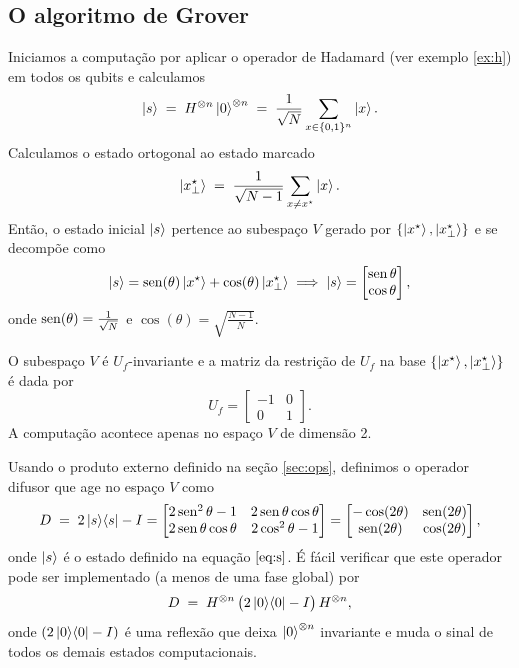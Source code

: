 \subsection{O algoritmo de Grover}
Iniciamos a computação por aplicar o operador de Hadamard (ver exemplo \ref{ex:h}) em todos os qubits e calculamos
\begin{equation}\label{eq:s}
\ket{s} \;=\; H^{\otimes n}\ket{0}^{\otimes n}
\;=\; \frac{1}{\sqrt{N}}\sum_{x\in\{0,1\}^n}\ket{x}.
\end{equation}
Calculamos o estado ortogonal ao estado marcado
\begin{equation}
\ket{x^\star_\perp}
\;=\;
\frac{1}{\sqrt{N-1}}\sum_{x\neq x^\star}\ket{x}.
\end{equation}
Então, o estado inicial $\ket{s}$ pertence ao subespaço $V$ gerado por $\{\ket{x^\star},\ket{x^{\star}_\perp}\}$ e se decompõe como
\begin{equation}
    \ket{s} = \operatorname{sen}(\theta)\ket{x^\star} + \cos(\theta)\ket{x^\star_\perp} \implies \ket{s} = \begin{bmatrix}
            \operatorname{sen} \theta \\
            \cos \theta
        \end{bmatrix},
\end{equation}
onde $\operatorname{sen}(\theta)=\frac{1}{\sqrt{N}}$ e $\cos(\theta)=\sqrt{\frac{N-1}{N}}$.

O subespaço $V$ é $U_f$-invariante e a matriz da restrição de $U_f$ na base $\{\ket{x^\star},\ket{x^{\star}_\perp}\}$ é dada por
\begin{equation}
    U_f = \begin{bmatrix}
        -1 & 0 \\
         0 & 1
    \end{bmatrix}.
\end{equation}
A computação acontece apenas no espaço $V$ de dimensão 2.

Usando o produto externo definido na seção \ref{sec:ops}, definimos o operador difusor que age no espaço $V$ como
\begin{equation}
D \;=\; 2\ket{s}\!\bra{s} - I = \begin{bmatrix}
    2\operatorname{sen}^2\theta - 1 & 2\operatorname{sen}\theta\cos\theta \\
    2\operatorname{sen}\theta\cos\theta & 2\cos^2\theta - 1
\end{bmatrix} = \begin{bmatrix}
    -\cos(2\theta) & \operatorname{sen}(2\theta) \\
    \operatorname{sen}(2\theta) & \cos(2\theta)
\end{bmatrix},
\end{equation}
onde $\ket{s}$ é o estado definido na equação $\eqref{eq:s}$. É fácil verificar que este operador pode ser implementado (a menos de uma fase global) por
\begin{equation}
D \;=\; H^{\otimes n}\,\bigl(2\ket{0}\!\bra{0}-I\bigr)\,H^{\otimes n},
\end{equation}
onde $(2\ket{0}\!\bra{0}-I)$ é uma reflexão que deixa $\ket{0}^{\otimes n}$ invariante e muda o sinal
de todos os demais estados computacionais.

